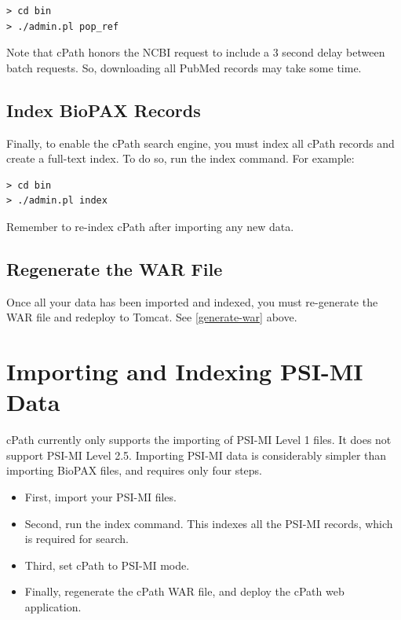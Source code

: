 \documentclass[letterpaper,12pt]{article}
\begin{document}
\begin{verbatim}
> cd bin
> ./admin.pl pop_ref
\end{verbatim}

Note that cPath honors the NCBI request to include a 3 second delay between batch requests.  So, downloading all PubMed records may take some time.

\subsection{Index BioPAX Records}

Finally, to enable the cPath search engine, you must index all cPath records and create a full-text index.  To do so, run the index command.  For example:

\begin{verbatim}
> cd bin
> ./admin.pl index
\end{verbatim}

Remember to re-index cPath after importing any new data.

\subsection{Regenerate the WAR File}

Once all your data has been imported and indexed, you must re-generate the WAR file and redeploy to Tomcat.  See \ref{generate-war} above.

\section{Importing and Indexing PSI-MI Data}
\label{import-psi}

cPath currently only supports the importing of PSI-MI Level 1 files.  It does not support PSI-MI Level 2.5.  Importing PSI-MI data is considerably simpler than importing BioPAX files, and requires only four steps.

\begin{itemize}
\item First, import your PSI-MI files.

\item Second, run the index command.  This indexes all the PSI-MI records, which is required for search.

\item Third, set cPath to PSI-MI mode.

\item Finally, regenerate the cPath WAR file, and deploy the cPath web application.

\end{itemize}
\end{document}
